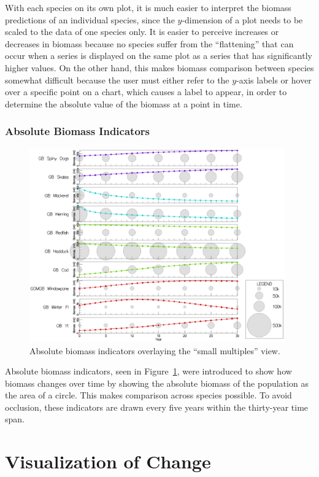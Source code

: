 With each species on its own plot, it is much easier to interpret the biomass predictions of an individual species, since the $y$-dimension of a plot needs to be scaled to the data of one species only.  It is easier to perceive increases or decreases in biomass because no species suffer from the ``flattening'' that can occur when a series is displayed on the same plot as a series that has significantly higher values.  On the other hand, this makes biomass comparison between species somewhat difficult because the user must either refer to the $y$-axis labels or hover over a specific point on a chart, which causes a label to appear, in order to determine the absolute value of the biomass at a point in time.

\subsubsection{Absolute Biomass Indicators}

\begin{figure}[h]
	\centering
	\includegraphics[width=11cm]{figures/eps/msprod_abssize.eps}
	\caption{Absolute biomass indicators overlaying the ``small multiples'' view.}
	\label{fig:msprod_abssize}
\end{figure}

Absolute biomass indicators, seen in Figure~\ref{fig:msprod_abssize}, were introduced to show how biomass changes over time by showing the absolute biomass of the population as the area of a circle.  This makes comparison across species possible.  To avoid occlusion, these indicators are drawn every five years within the thirty-year time span.

\section{Visualization of Change}

